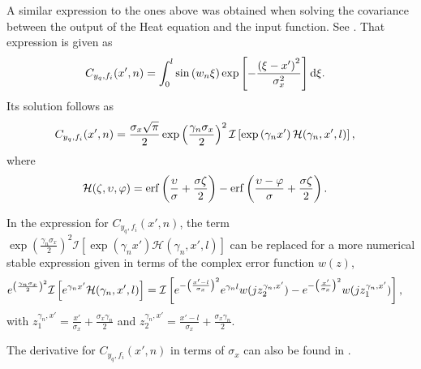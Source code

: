 \documentclass[a4paper,10pt]{article}
\newcommand{\dif}{\textrm{d}}
\DeclareMathOperator{\erf}{erf}
\begin{document}
A similar expression to the ones above was obtained when solving the
covariance between the output of the Heat equation and the input
function. See \cite{Alvarez:HeatEquationReport}. That expression is
given as
\begin{align}
C_{y_q,f_i}(x',n)&=\int_0^l\sin\left(w_n\xi\right)
\exp\left[-\frac{\left(\xi-x'\right)^2}{\sigma^2_x}\right]\dif\xi.\notag
\end{align}
Its solution follows as
\begin{align}
C_{y_q,f_i}(x',n)&=\frac{\sigma_x\sqrt{\pi}}{2}\exp\left(\frac{\gamma_n\sigma_x}{2}\right)^2\mathcal{I}\left[\exp\left(\gamma_nx'\right)\mathcal{H}(\gamma_n,x',l)\right],\notag
\end{align}
where
\begin{align}
\notag \mathcal{H}(\zeta,\upsilon,\varphi)&=\erf\left(\frac{\upsilon}{\sigma}+\frac{\sigma \zeta}{2}\right)-\erf\left(\frac{\upsilon-\varphi}{\sigma}+\frac{\sigma \zeta}{2}\right).
\end{align}

In the expression for $C_{y_q,f_i}(x',n)$, the term
$\exp\left(\frac{\gamma_n\sigma_x}{2}\right)^2\mathcal{I}\left[\exp\left(\gamma_nx'\right)\mathcal{H}(\gamma_n,x',l)\right]$
can be replaced for a more numerical stable expression given in terms
of the complex error function $w(z)$,
\begin{align}
\notag
e^{\left(\frac{\gamma_n\sigma_x}{2}\right)^2}\mathcal{I}\left[e^{\gamma_nx'}\mathcal{H}(\gamma_n,x',l)\right]
&=\mathcal{I}\left[e^{-\left(\frac{x'-l}{\sigma_x}\right)^2}e^{\gamma_nl}w(jz_2^{\gamma_n,x'})-e^{-\left(\frac{x'}{\sigma_x}\right)^2}
w(jz_1^{\gamma_n,x'})\right],
\end{align}
with $z_1^{\gamma_n,x'}=\frac{x'}{\sigma_x}+\frac{\sigma_x \gamma_n}{2}$ and $z_2^{\gamma_n,x'}=\frac{x'-l}{\sigma_x}
+\frac{\sigma_x\gamma_n}{2}$.

The derivative for $C_{y_q,f_i}(x',n)$ in terms of $\sigma_x$ can also
be found in \cite{Alvarez:HeatEquationReport}.

\small{

}
\end{document}
